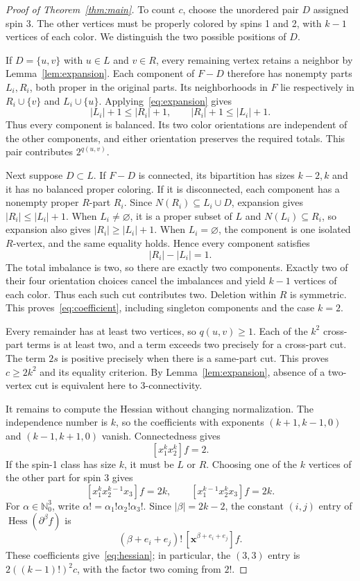 \documentclass[11pt]{article}
\DeclareMathOperator{\Hess}{Hess}
\newcommand{\N}{\mathbb{N}_0}
\begin{document}
\begin{proof}[Proof of Theorem~\ref{thm:main}]
To count $c$, choose the unordered pair $D$ assigned spin 3. The other
vertices must be properly colored by spins 1 and 2, with $k-1$ vertices
of each color. We distinguish the two possible positions of $D$.

If $D=\{u,v\}$ with $u\in L$ and $v\in R$, every remaining vertex
retains a neighbor by Lemma~\ref{lem:expansion}. Each component of $F-D$
therefore has nonempty parts $L_i,R_i$, both proper in the original parts.
Its neighborhoods in $F$ lie respectively in $R_i\cup\{v\}$ and
$L_i\cup\{u\}$. Applying~\eqref{eq:expansion} gives
\[
 |L_i|+1\le |R_i|+1,\qquad |R_i|+1\le |L_i|+1.
\]
Thus every component is balanced. Its two color orientations are
independent of the other components, and either orientation preserves
the required totals. This pair contributes $2^{q(u,v)}$.

Next suppose $D\subset L$. If $F-D$ is connected, its bipartition
has sizes $k-2,k$ and it has no balanced proper coloring. If it is
disconnected, each component has a nonempty proper $R$-part $R_i$.
Since $N(R_i)\subseteq L_i\cup D$, expansion gives
$|R_i|\le |L_i|+1$. When $L_i\ne\varnothing$, it is a proper
subset of $L$ and $N(L_i)\subseteq R_i$, so expansion also gives
$|R_i|\ge |L_i|+1$. When $L_i=\varnothing$, the component is
one isolated $R$-vertex, and the same equality holds. Hence every
component satisfies
\[
 |R_i|-|L_i|=1.
\]
The total imbalance is two, so there are exactly two components.
Exactly two of their four orientation choices cancel the imbalances
and yield $k-1$ vertices of each color. Thus each such cut contributes
two. Deletion within $R$ is symmetric. This proves~\eqref{eq:coefficient},
including singleton components and the case $k=2$.

Every remainder has at least two vertices, so $q(u,v)\ge1$.
Each of the $k^2$ cross-part terms is at least two, and a term exceeds
two precisely for a cross-part cut. The term $2s$ is positive precisely
when there is a same-part cut. This proves $c\ge2k^2$ and its equality
criterion. By Lemma~\ref{lem:expansion}, absence of a two-vertex cut is
equivalent here to 3-connectivity.

It remains to compute the Hessian without changing normalization.
The independence number is $k$, so the coefficients with exponents
$(k+1,k-1,0)$ and $(k-1,k+1,0)$ vanish. Connectedness gives
\[
 [x_1^kx_2^k]f=2.
\]
If the spin-1 class has size $k$, it must be $L$ or $R$. Choosing
one of the $k$ vertices of the other part for spin 3 gives
\[
 [x_1^kx_2^{k-1}x_3]f=2k,
 \qquad [x_1^{k-1}x_2^kx_3]f=2k.
\]
For $\alpha\in\N^3$, write $\alpha!=\alpha_1!\alpha_2!\alpha_3!$.
Since $|\beta|=2k-2$, the constant $(i,j)$ entry of
$\Hess(\partial^\beta f)$ is
\[
 (\beta+e_i+e_j)!\,[\mathbf{x}^{\beta+e_i+e_j}]f.
\]
These coefficients give~\eqref{eq:hessian}; in particular, the $(3,3)$
entry is $2((k-1)!)^2c$, with the factor two coming from $2!$.


\end{proof}
\end{document}
